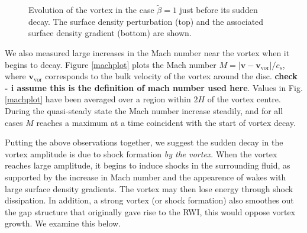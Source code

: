 \begin{figure}
{  }
\hfill
\hfill
  \caption{Evolution of the vortex in the case $\tilde{\beta}=1$
    just before its sudden decay. The surface density perturbation
    (top) and the associated surface density gradient (bottom) are shown.
    \label{shockplot}}
\end{figure}

We also measured large increases in the Mach number near
the vortex when it begins to decay. Figure \ref{machplot} plots the
Mach number $M=|\bm{v} - \bm{v}_\mathrm{vor}|/c_s$, where
$\bm{v}_\mathrm{vor}$ corresponds to the bulk velocity of the vortex
around the disc. {\bf check - i assume this is the definition of mach
  number used here}. Values in Fig. \ref{machplot} have been averaged over
a region within $2H$ of the vortex centre.    
During the quasi-steady state the Mach number increase
steadily, and for all cases $M$ reaches a maximum at 
a time coincident with the start of vortex decay.  

Putting the above observations together, we suggest the sudden decay
in the vortex amplitude is due to shock formation \emph{by the
  vortex}. When the vortex reaches large amplitude, it begins
to induce shocks in the surrounding fluid, as supported by the
increase in Mach number and the appearence of wakes with large surface
density gradients. The vortex may then lose energy through shock
dissipation. In addition, a strong vortex (or shock formation) 
also smoothes out the gap structure that originally gave rise to the
RWI, this would oppose vortex growth. We examine this below.

